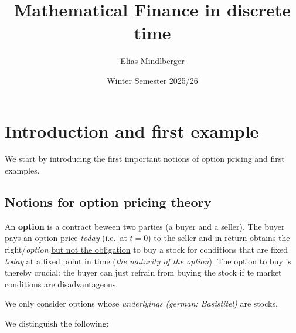 \documentclass[12pt]{amsart}
\title{Mathematical Finance in discrete time}
\author{Elias Mindlberger}
\date{Winter Semester 2025/26}
\begin{document}
\maketitle

\tableofcontents
\bigskip

\section{Introduction and first example}

We start by introducing the first important notions of option pricing and first examples.

\subsection{Notions for option pricing theory}

An \textbf{option} is a contract beween two parties (a buyer and a seller). The buyer pays an option price \emph{today} (i.e.\ at \(t=0\)) to the seller and in return obtains the right/\emph{option} \underline{but not the obligation} to buy a stock for conditions that are fixed \emph{today} at a fixed point in time (\emph{the maturity of the option}).
The option to buy is thereby crucial: the buyer can just refrain from buying the stock if te market conditions are disadvantageous.

We only consider options whose \emph{underlyings (german: Basistitel)} are stocks.\newpage

We distinguish the following:

\end{document}
